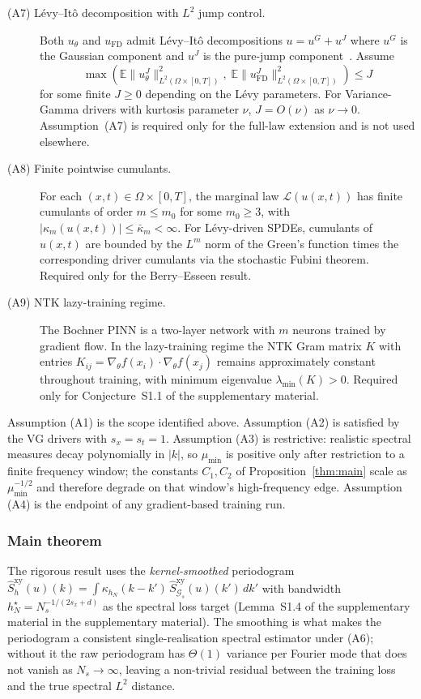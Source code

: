 \documentclass[10pt]{elsarticle}
\begin{document}
\begin{description}
\item[(A7) L\'evy--It\^o decomposition with $L^2$ jump control.]
Both $u_\theta$ and $u_{\mathrm{FD}}$ admit L\'evy--It\^o decompositions
$u=u^G+u^J$ where $u^G$ is the Gaussian component and $u^J$ is the
pure-jump component~\cite{ContTankov2003}.
Assume
\[
\max\!\left(\mathbb{E}\|u_\theta^J\|^2_{L^2(\Omega\times[0,T])},\;
\mathbb{E}\|u_{\mathrm{FD}}^J\|^2_{L^2(\Omega\times[0,T])}\right)\le J
\]
for some finite $J\ge 0$ depending on the L\'evy parameters.
For Variance-Gamma drivers with kurtosis parameter $\nu$, $J=O(\nu)$
as $\nu\to 0$.
Assumption~(A7) is required only for
the full-law extension and is not used elsewhere.

\item[(A8) Finite pointwise cumulants.]
For each $(x,t)\in\Omega\times[0,T]$, the marginal law
$\mathcal{L}(u(x,t))$ has finite cumulants of order $m\le m_0$ for
some $m_0\ge 3$, with $|\kappa_m(u(x,t))|\le\bar\kappa_m<\infty$.
For Lévy-driven SPDEs, cumulants of $u(x,t)$ are bounded by
the $L^m$ norm of the Green's function times the corresponding driver
cumulants via the stochastic Fubini theorem.
Required only for the Berry--Esseen result.

\item[(A9) NTK lazy-training regime.]
The Bochner PINN is a two-layer network with $m$ neurons trained by
gradient flow. In the lazy-training regime the NTK Gram matrix $K$
with entries $K_{ij}=\nabla_\theta f(x_i)\cdot\nabla_\theta f(x_j)$
remains approximately constant throughout training, with minimum
eigenvalue $\lambda_{\min}(K)>0$.
Required only for Conjecture~S1.1 of the supplementary material.
\end{description}

Assumption (A1) is the scope identified above.
Assumption (A2) is satisfied by the VG drivers with
\(s_x = s_t = 1\). Assumption (A3) is restrictive: realistic
spectral measures decay polynomially in \(|k|\), so \(\mu_{\min}\)
is positive only after restriction to a finite frequency window;
the constants \(C_1, C_2\) of Proposition~\ref{thm:main} scale as
\(\mu_{\min}^{-1/2}\) and therefore degrade on that window's
high-frequency edge. Assumption (A4) is the endpoint of any
gradient-based training run.

\subsubsection{Main theorem}

The rigorous result uses the \emph{kernel-smoothed} periodogram
$\widehat S^{\mathrm{xy}}_h(u)(k) = \int \kappa_{h_N}(k-k')\,
\widehat S^{\mathrm{xy}}_{\mathcal G_s}(u)(k')\,dk'$ with bandwidth
$h_N^\star = N_s^{-1/(2s_x+d)}$ as the spectral loss target
(Lemma~S1.4 of the supplementary material in the supplementary material).
The smoothing is what makes the periodogram a consistent
single-realisation spectral estimator under (A6); without it the
raw periodogram has $\Theta(1)$ variance per Fourier mode that
does not vanish as $N_s \to \infty$, leaving a non-trivial residual
between the training loss and the true spectral $L^2$ distance.
\end{document}
